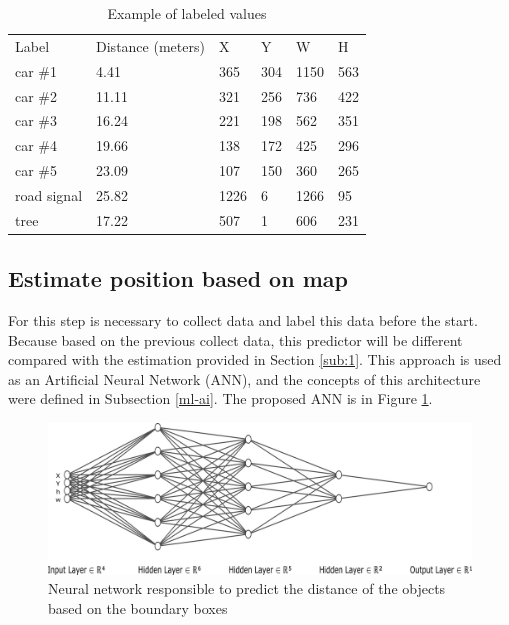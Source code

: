 \begin{table}[H]
\centering
\caption{Example of labeled values}
\begin{tabular}{llllll} 
\hline
Label        & Distance (meters) & X    & Y   & W    & H   \\
car \#1         & 4.41     & 365  & 304 & 1150 & 563  \\
car \#2        & 11.11    & 321  & 256 & 736  & 422  \\
car \#3        & 16.24    & 221  & 198 & 562  & 351  \\
car \#4        & 19.66    & 138  & 172 & 425  & 296  \\
car \#5        & 23.09    & 107  & 150 & 360  & 265  \\
road signal & 25.82    & 1226 & 6   & 1266 & 95   \\
tree        & 17.22    & 507  & 1   & 606  & 231  \\
\hline
\end{tabular}
 \label{tab:output_table}
\end{table}



\subsection{Estimate position based on map}

For this step is necessary to collect data and label this data before the start. Because based on the previous collect data, this predictor will be different compared with the estimation provided in Section \ref{sub:1}. This approach is used as an Artificial Neural Network (ANN), and the concepts of this architecture were defined in 
Subsection \ref{ml-ai}. The proposed ANN is in Figure \ref{fig:rede_neural}.


\begin{figure}[H]
\centering
\includegraphics[width=\textwidth]{imagens/nn.png}
\caption{Neural network responsible to predict the distance of the objects based on the boundary boxes}
\label{fig:rede_neural}
\end{figure}

